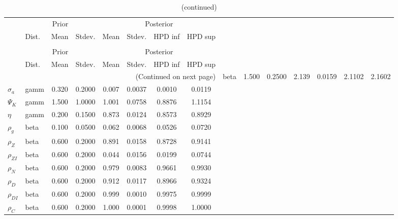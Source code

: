  
\begin{center}
\begin{longtable}{llcccccc} 
\caption{Results from Metropolis-Hastings (parameters)}
 \label{Table:MHPosterior:1}\\
\toprule 
  & \multicolumn{3}{c}{Prior}  &  \multicolumn{4}{c}{Posterior} \\
  \cmidrule(r{.75em}){2-4} \cmidrule(r{.75em}){5-8}
  & Dist. & Mean  & Stdev. & Mean & Stdev. & HPD inf & HPD sup\\
\midrule \endfirsthead 
\caption{(continued)}\\\toprule 
  & \multicolumn{3}{c}{Prior}  &  \multicolumn{4}{c}{Posterior} \\
  \cmidrule(r{.75em}){2-4} \cmidrule(r{.75em}){5-8}
  & Dist. & Mean  & Stdev. & Mean & Stdev. & HPD inf & HPD sup\\
\midrule \endhead 
\bottomrule \multicolumn{8}{r}{(Continued on next page)} \endfoot 
\bottomrule \endlastfoot 
${\gamma}$ & beta &   1.500 & 0.2500 &   2.139& 0.0159 &  2.1102 &  2.1602 \\ 
${\sigma_a}$ & gamm &   0.320 & 0.2000 &   0.007& 0.0037 &  0.0010 &  0.0119 \\ 
${\Psi_K}$ & gamm &   1.500 & 1.0000 &   1.001& 0.0758 &  0.8876 &  1.1154 \\ 
${\eta}$ & gamm &   0.200 & 0.1500 &   0.873& 0.0124 &  0.8573 &  0.8929 \\ 
${\rho_g}$ & beta &   0.100 & 0.0500 &   0.062& 0.0068 &  0.0526 &  0.0720 \\ 
${\rho_Z}$ & beta &   0.600 & 0.2000 &   0.891& 0.0158 &  0.8728 &  0.9141 \\ 
${\rho_{ZI}}$ & beta &   0.600 & 0.2000 &   0.044& 0.0156 &  0.0199 &  0.0744 \\ 
${\rho_N}$ & beta &   0.600 & 0.2000 &   0.979& 0.0083 &  0.9661 &  0.9930 \\ 
${\rho_D}$ & beta &   0.600 & 0.2000 &   0.912& 0.0117 &  0.8966 &  0.9324 \\ 
${\rho_{DI}}$ & beta &   0.600 & 0.2000 &   0.999& 0.0010 &  0.9975 &  0.9999 \\ 
${\rho_C}$ & beta &   0.600 & 0.2000 &   1.000& 0.0001 &  0.9998 &  1.0000 \\ 
\end{longtable}
 \end{center}
